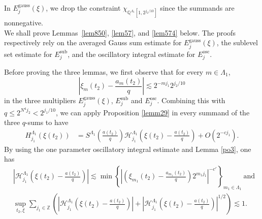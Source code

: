 \documentclass[11 pt,letterpaper]{amsart}
\theoremstyle{plain}
\theoremstyle{definition}
\theoremstyle{remark} \theoremstyle{exam} \theoremstyle{ob}
\numberwithin{equation}{section}
\begin{document}
In $E^{\mathrm{gauss}}_j(\xi)$, we drop the constraint  $\chi_{\mathbb Q^{\Lambda_1}[1,2^{j_2/10}]}$
since the summands are nonnegative.\\


We shall prove Lemmas~\ref{lem850}, \ref{lem57}, and \ref{lem574} below.
The proofs respectively rely on the averaged Gauss sum estimate for
\(E^{\mathrm{gauss}}_j(\xi)\), the sublevel set estimate for
\(E^{\mathrm{sub}}_j\), and the oscillatory integral estimate for
\(E^{\mathrm{osc}}_j\).

Before proving the three lemmas, we first observe that for every $m\in \Lambda_1$,
$$  \left|  \xi_m(t_2)-\frac{a_m(t_2)}{q} \right| \lesssim 2^{-mj_1} 2^{ j_2/10}$$ in the  three multipliers \(E^{\mathrm{gauss}}_j(\xi)\), \(E^{\mathrm{sub}}_j\) and  \(E^{\mathrm{osc}}_j\). Combining   this  with  $q\le 2^{N^4j_2}<2^{j_1/10}$, we can apply Proposition  \ref{lemm29}  in every   summand  of the three $q$-sums to have
\begin{align} \label{2300}
	H^{\Lambda_1}_{j_1}( \xi(t_2) )&=  S^{\Lambda_1}\left(\frac{a(t_2)}{q} \right)  \mathcal{H}^{\Lambda_1}_{j_1}\left( \xi(t_2)-\frac{a(t_2)}{q}\right)+O(2^{-cj_1}).
\end{align}
By using the one parameter oscillatory integral estimate and Lemma \ref{po3}, one has
\begin{align}
	&\left|\mathcal{H}^{\Lambda_1}_{j_1}\left(\xi(t_2)-\frac{a(t_2)}{q}\right)\right| \lesssim\min\left\{ \left|\left(\xi_{m_1}(t_2)-\frac{a_{m_1}(t_2)}{q}\right)2^{m_1 j_1}\right|^{-c'}\right\}_{m_1\in \Lambda_1}\ \text{and}\   \label{hees}\\
	&\sup_{t_2,\xi}\sum_{j_1\in \mathbb{Z}}\left( \left|\mathcal{H}^{\Lambda_1}_{j_1}\left(\xi(t_2)-\frac{a(t_2)}{q}\right)\right|   + \left|\mathcal{H}^{\Lambda_1}_{j_1}\left(\xi(t_2)-\frac{a(t_2)}{q}\right)\right|^{1/2} \right)  \lesssim 1. \label{2203}
\end{align}
\end{document}
